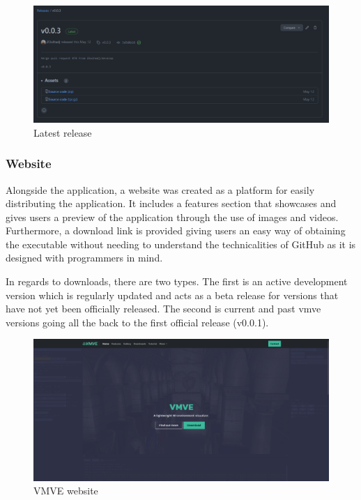 \documentclass[11pt]{article}
\begin{document}
\begin{figure}[H]
  \centering
  \includegraphics[width=\textwidth]{images/vmve_release.png}
  \caption{Latest release}
  \label{fig:latest_release}
\end{figure}

\subsubsection{Website}
Alongside the application, a website was created as a platform for easily
distributing the application. It includes a features section that showcases and
gives users a preview of the application through the use of images and videos.
Furthermore, a download link is provided giving users an easy way of obtaining
the executable without needing to understand the technicalities of GitHub as it
is designed with programmers in mind.

In regards to downloads, there are two types. The first is an active development
version which is regularly updated and acts as a beta release for versions that
have not yet been officially released. The second is current and past
\gls*{vmve} versions going all the back to the first official release (v0.0.1).

\begin{figure}[H]
  \centering
  \includegraphics[width=\textwidth]{images/website.png}
  \caption{VMVE website}
  \label{fig:website}
\end{figure}
\end{document}
